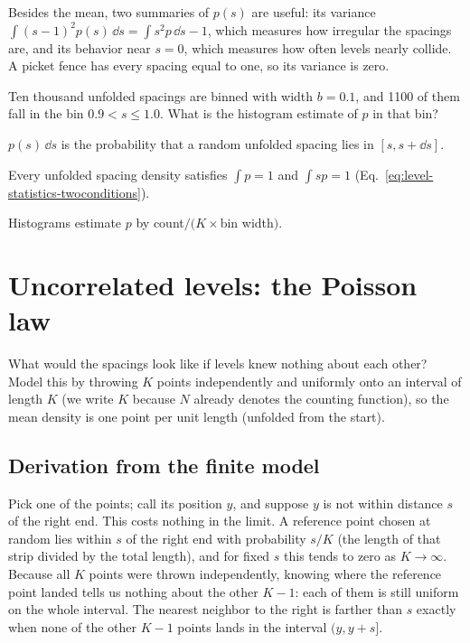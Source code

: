 Besides the mean, two summaries of $p(s)$ are useful: its variance $\int (s-1)^2p(s)\,\dd s=\int s^2p\,\dd s-1$, which measures how irregular the spacings are, and its behavior near $s=0$, which measures how often levels nearly collide. A picket fence has every spacing equal to one, so its variance is zero.

\begin{checkpoint}
Ten thousand unfolded spacings are binned with width $b=0.1$, and 1100 of them fall in the bin $0.9<s\le1.0$. What is the histogram estimate of $p$ in that bin?
\end{checkpoint}

\begin{keyideas}
\item $p(s)\,\dd s$ is the probability that a random unfolded spacing lies in $[s,s+\dd s]$.
\item Every unfolded spacing density satisfies $\int p=1$ and $\int sp=1$ (Eq.~\eqref{eq:level-statistics-twoconditions}).
\item Histograms estimate $p$ by count$/(K\times$bin width$)$.
\end{keyideas}

\section{Uncorrelated levels: the Poisson law}\label{sec:level-statistics-poisson}

What would the spacings look like if levels knew nothing about each other? Model this by throwing $K$ points independently and uniformly onto an interval of length $K$ (we write $K$ because $N$ already denotes the counting function), so the mean density is one point per unit length (unfolded from the start).

\subsection{Derivation from the finite model}

Pick one of the points; call its position $y$, and suppose $y$ is not within distance $s$ of the right end. This costs nothing in the limit. A reference point chosen at random lies within $s$ of the right end with probability $s/K$ (the length of that strip divided by the total length), and for fixed $s$ this tends to zero as $K\to\infty$. Because all $K$ points were thrown independently, knowing where the reference point landed tells us nothing about the other $K-1$: each of them is still uniform on the whole interval. The nearest neighbor to the right is farther than $s$ exactly when none of the other $K-1$ points lands in the interval $(y,y+s]$.

